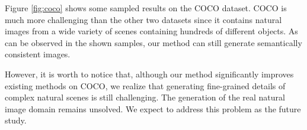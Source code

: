 \documentclass[10pt, letterpaper]{article}
\begin{document}
Figure \ref{fig:coco} shows some sampled results on the COCO dataset. COCO is much more challenging than the other two datasets since it contains natural images from a wide variety of scenes containing hundreds of different objects. 
As can be observed in the shown samples, our method can still generate semantically consistent images. %

However, it is worth to notice that, although our method significantly improves existing methods \cite{han2017stackgan,reed2016generative} on COCO, we realize that generating fine-grained details of complex natural scenes is still challenging. The generation of the real natural image domain remains unsolved. We expect to address this problem as the future study. 

\newpage
\end{document}
